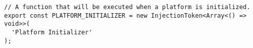 \begin{verbatim}
// A function that will be executed when a platform is initialized.
export const PLATFORM_INITIALIZER = new InjectionToken<Array<() => void>>(
  'Platform Initializer'
);
\end{verbatim}
